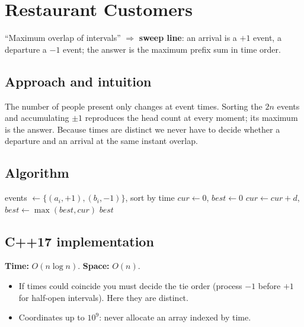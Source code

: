 \section{Restaurant Customers}
\label{sec:g-restaurant}


\begin{patternbox}
``Maximum overlap of intervals'' $\Rightarrow$ \textbf{sweep line}: an
arrival is a $+1$ event, a departure a $-1$ event; the answer is the maximum
prefix sum in time order.
\end{patternbox}

\subsection*{Approach and intuition}

The number of people present only changes at event times. Sorting the $2n$
events and accumulating $\pm1$ reproduces the head count at every moment; its
maximum is the answer. Because times are distinct we never have to decide
whether a departure and an arrival at the same instant overlap.

\subsection*{Algorithm}
\begin{algorithmic}[1]
\State events $\gets \{(a_i,+1),(b_i,-1)\}$, sort by time
\State $cur\gets0$, $best\gets0$
 \State $cur\gets cur+d$, $best\gets\max(best,cur)$ \EndFor
\State \Return $best$
\end{algorithmic}


\subsection*{C++17 implementation}

\begin{complexitybox}
\textbf{Time:} $O(n\log n)$. \textbf{Space:} $O(n)$.
\end{complexitybox}

\begin{pitfallbox}
\begin{itemize}
  \item If times could coincide you must decide the tie order (process
        $-1$ before $+1$ for half-open intervals). Here they are distinct.
  \item Coordinates up to $10^9$: never allocate an array indexed by time.
\end{itemize}
\end{pitfallbox}
